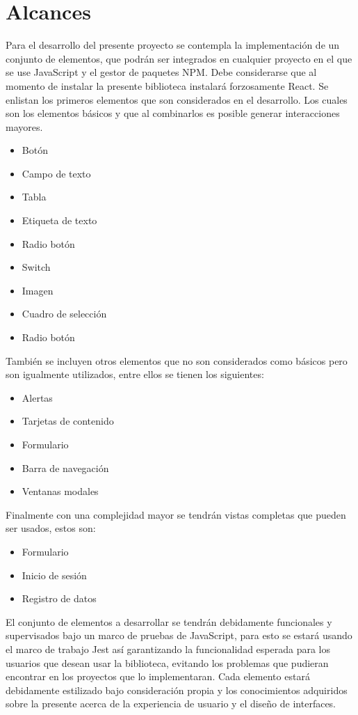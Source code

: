 \section{Alcances}

Para el desarrollo del presente proyecto se contempla la implementación de un conjunto de elementos, que podrán ser integrados en cualquier proyecto en el que se use JavaScript y el gestor de paquetes NPM. Debe considerarse que al momento de instalar la presente biblioteca instalará forzosamente React.
 \newline
Se enlistan los primeros elementos que son considerados en el desarrollo. Los cuales son los elementos básicos y que al combinarlos es posible generar interacciones mayores.
 \newline
\begin{itemize}
\item Botón 
\item Campo de texto
\item Tabla
\item Etiqueta de texto
\item Radio botón
\item Switch
\item Imagen
\item Cuadro de selección
\item Radio botón 
\end{itemize}
 \newline
También se incluyen otros elementos que no son considerados como básicos pero son  igualmente utilizados, entre ellos se tienen los siguientes:
 \newline
 \begin{itemize}
\item  Alertas
\item Tarjetas de contenido
\item Formulario
\item Barra de navegación
\item Ventanas modales
\end{itemize}
\newline
 Finalmente con una complejidad mayor se tendrán vistas completas que pueden ser usados, estos son:
  \newline
 \begin{itemize}
\item  Formulario
\item Inicio de sesión
\item Registro de datos
\end{itemize}
\newline
El conjunto de elementos a desarrollar se tendrán debidamente funcionales y supervisados bajo un marco de pruebas de JavaScript, para esto se estará usando el marco de trabajo Jest así garantizando la funcionalidad esperada para los usuarios que desean usar la biblioteca, evitando los problemas que pudieran encontrar en los proyectos que lo implementaran. 
Cada elemento estará debidamente estilizado bajo consideración propia y los conocimientos adquiridos sobre la presente acerca de la experiencia de usuario y el diseño de interfaces.

